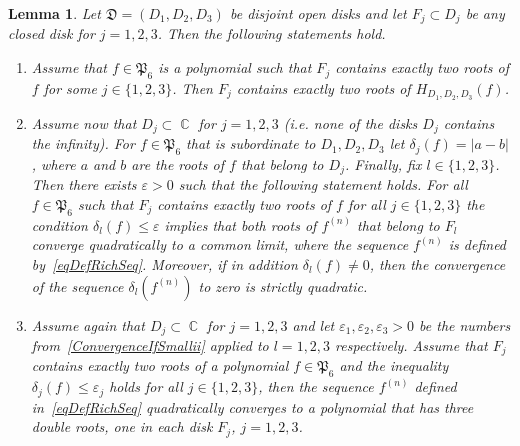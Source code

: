 \documentclass{amsart}
\numberwithin{equation}{section}
\newtheorem{lemma}[theorem]{Lemma}
\theoremstyle{definition}
\theoremstyle{remark}
\DeclareMathOperator{\CC}{\mathbb C}
\begin{document}
	\begin{lemma}\label{lemConvergenceIfSmall}
		Let $\mathfrak D = (D_1, D_2, D_3)$ be disjoint open disks and let $F_j \subset D_j$ be any closed disk for $j = 1,2,3$. Then the following statements hold.
		\begin{enumerate}[label=(\roman*)]
			\item\label{ConvergenceIfSmalli} Assume that $f \in \mathfrak P_6$ is a polynomial such that $F_j$ contains exactly two roots of $f$ for some $j \in \{1,2,3\}$. Then $F_j$ contains exactly two roots of $H_{D_1,D_2,D_3}(f)$.
			\item\label{ConvergenceIfSmallii} Assume now that $D_j \subset \CC$ for $j = 1,2,3$ (i.e. none of the disks $D_j$ contains the infinity). For $f \in \mathfrak P_6$ that is subordinate to $D_1,D_2,D_3$ let $\delta_j(f) = |a - b|$, where $a$ and $b$ are the roots of $f$ that belong to $D_j$. Finally, fix $l \in \{1,2,3\}$. Then there exists $\varepsilon > 0$ such that the following statement holds. 
			For all $f \in \mathfrak P_6$ such that $F_j$ contains exactly two roots of $f$ for all $j \in \{1,2,3\}$ the condition $\delta_l(f) \le \varepsilon$ implies that both roots of $f^{(n)}$ that belong to $F_l$ converge quadratically to a common limit, where the sequence $f^{(n)}$ is defined by~\eqref{eqDefRichSeq}. Moreover, if in addition $\delta_l(f) \ne 0$, then the convergence of the sequence $\delta_l\left(f^{(n)}\right)$ to zero is strictly quadratic.
			\item\label{ConvergenceIfSmalliii} Assume again that $D_j \subset \CC$ for $j = 1,2,3$ and let $\varepsilon_1, \varepsilon_2,\varepsilon_3 > 0$ be the numbers from~\ref{ConvergenceIfSmallii} applied to $l = 1,2,3$ respectively. Assume that $F_j$ contains exactly two roots of a polynomial $f \in \mathfrak P_6$ and the inequality $\delta_j(f) \le \varepsilon_j$ holds for all $j \in \{1,2,3\}$, then the sequence $f^{(n)}$ defined in~\eqref{eqDefRichSeq} quadratically converges to a polynomial that has three double roots, one in each disk $F_j$, $j = 1,2,3$.
		\end{enumerate}
	\end{lemma}
\end{document}
